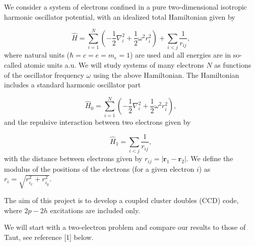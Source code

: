 \documentclass[%
oneside,                 %
final,                   %
10pt]{article}
\begin{document}
We consider a system of electrons confined in a pure two-dimensional
isotropic harmonic oscillator potential, with an idealized  total Hamiltonian given by

\begin{equation}
\label{eq:finalH}
\hat{H}=\sum_{i=1}^{N} \left(  -\frac{1}{2} \nabla_i^2
+ \frac{1}{2} \omega^2r_i^2  \right)+\sum_{i<j}\frac{1}{r_{ij}},
\end{equation}
where natural units ($\hbar=c=e=m_e=1$) are used and all energies are in
so-called atomic units a.u. We will study systems of many electrons $N$ as
functions of the oscillator frequency  $\omega$ using the above Hamiltonian.
The Hamiltonian includes a standard harmonic oscillator part

\begin{equation*}
\hat{H}_0=\sum_{i=1}^{N} \left(  -\frac{1}{2} \nabla_i^2 + \frac{1}{2} \omega^2r_i^2  \right),
\end{equation*}
and the repulsive interaction between two electrons given by

\begin{equation*}
\hat{H}_1=\sum_{i<j}\frac{1}{r_{ij}},
\end{equation*}
with the distance between electrons given by $r_{ij}=\vert \bm{r}_1-\bm{r}_2\vert$. We define the
modulus of the positions of the electrons (for a given electron $i$) as $r_i = \sqrt{r_{i_x}^2+r_{i_y}^2}$.

The aim of this project is to develop a coupled cluster doubles (CCD) code, where $2p-2h$ excitations are included only.

We will start with a two-electron problem and compare our results to those of Taut, see reference [1] below.
\end{document}
